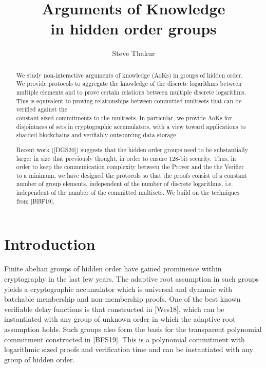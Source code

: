 \documentclass[11pt, lettersize, notitlepage, leqno, footskip=0.6cm]{article}
\numberwithin{equation}{section}
\begin{document}
 
\title{Arguments of Knowledge\\ in hidden order groups}
\author{Steve Thakur}
\affil{}
\date{\vspace{-6ex}}
 
\maketitle

\begin{abstract} We study non-interactive arguments of knowledge (AoKs) in groups of hidden order. We provide protocols to aggregate the knowledge of the discrete logarithms between multiple elements and to prove certain relations between multiple discrete logarithms. This is equivalent to proving relationships between committed multisets that can be verified against the\\ constant-sized commitments to the multisets. In particular, we provide AoKs for disjointness of sets in cryptographic accumulators, with a view toward applications to sharded blockchains and verifiably outsourcing data storage. 

Recent work ([DGS20]) suggests that the hidden order groups need to be substantially larger in size that previously thought, in order to ensure $128$-bit security. Thus, in order to keep the communication complexity between the Prover and the the Verifier to a minimum, we have designed the protocols so that the proofs consist of a constant number of group elements, independent of the number of discrete logarithms, i.e. independent of the number of the committed multisets. We build on the techniques from [BBF19].\end{abstract}

\section{\fontsize{12}{12}\selectfont Introduction  }


Finite abelian groups of hidden order have gained prominence within cryptography in the last few years. The adaptive root assumption in such groups yields a cryptographic accumulator which is universal and dynamic with batchable membership and non-membership proofs. One of the best known verifiable delay functions is that constructed in [Wes18], which can be instantiated with any group of unknown order in which the adaptive root assumption holds. Such groups also form the basis for the transparent polynomial commitment constructed in [BFS19]. This is a polynomial commitment with logarithmic sized proofs and verification time and can be instantiated with any group of hidden order.
\end{document}

